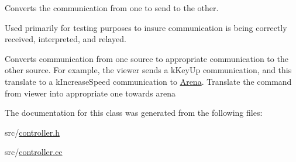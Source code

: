 Converts the communication from one to send to the other. 

Used primarily for testing purposes to insure communication is being correctly received, interpreted, and relayed.

Converts communication from one source to appropriate communication to the other source. For example, the viewer sends a k\+Key\+Up communication, and this translate to a k\+Increase\+Speed communication to \hyperlink{classArena}{Arena}. Translate the command from viewer into appropriate one towards arena 

The documentation for this class was generated from the following files\+:\begin{DoxyCompactItemize}
\item 
src/\hyperlink{controller_8h}{controller.\+h}\item 
src/\hyperlink{controller_8cc}{controller.\+cc}\end{DoxyCompactItemize}
